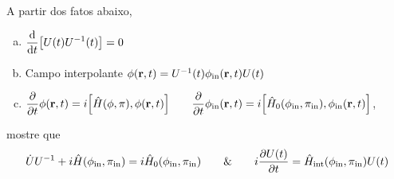 \documentclass[a4paper, 11pt, oneside]{impression}
\begin{document}
\begin{exercise}
    A partir dos fatos abaixo,
    \begin{enumerate}[(a)]
        \item $\displaystyle\dv{}{t}\qty[U(t)U^{-1}(t)] = 0$
        \item Campo interpolante $\phi(\vb{r},t) = U^{-1}(t)\phi_{\text{in}}(\vb{r},t)U(t)$
        \item $\displaystyle\pdv{}{t}\phi(\vb{r},t) = i\qty[\hat{H}(\phi,\pi),\phi(\vb{r},t)] \qquad \displaystyle\pdv{}{t}\phi_{\text{in}}(\vb{r},t) = i\qty[\hat{H}_{0}(\phi_{\text{in}},\pi_{\text{in}}),\phi_{\text{in}}(\vb{r},t)] $, 
    \end{enumerate}
    mostre que
        \begin{equation*}
            \dot{U}U^{-1} + i\hat{H}(\phi_{\text{in}},\pi_{\text{in}}) = i\hat{H}_{0}(\phi_{\text{in}}, \pi_{\text{in}}) \qquad \& \qquad 
            i\pdv{U(t)}{t} = \hat{H}_{\text{int}}(\phi_{\text{in}},\pi_{\text{in}}) U(t)
        \end{equation*}
\end{exercise}




\end{document}
